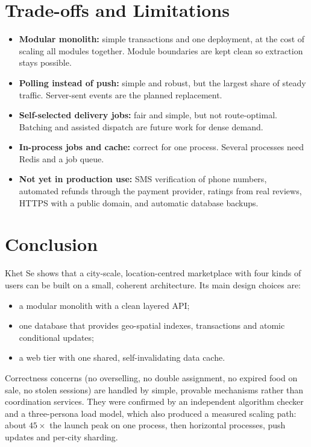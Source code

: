 \documentclass[11pt,a4paper]{article}
\begin{document}
\section{Trade-offs and Limitations}

\begin{itemize}
  \item \textbf{Modular monolith:} simple transactions and one deployment, at the cost of scaling all modules together. Module boundaries are kept clean so extraction stays possible.
  \item \textbf{Polling instead of push:} simple and robust, but the largest share of steady traffic. Server-sent events are the planned replacement.
  \item \textbf{Self-selected delivery jobs:} fair and simple, but not route-optimal. Batching and assisted dispatch are future work for dense demand.
  \item \textbf{In-process jobs and cache:} correct for one process. Several processes need Redis and a job queue.
  \item \textbf{Not yet in production use:} SMS verification of phone numbers, automated refunds through the payment provider, ratings from real reviews, HTTPS with a public domain, and automatic database backups.
\end{itemize}

\section{Conclusion}

Khet Se shows that a city-scale, location-centred marketplace with four kinds of users can be built on a small, coherent architecture. Its main design choices are:
\begin{itemize}
  \item a modular monolith with a clean layered API;
  \item one database that provides geo-spatial indexes, transactions and atomic conditional updates;
  \item a web tier with one shared, self-invalidating data cache.
\end{itemize}
Correctness concerns (no overselling, no double assignment, no expired food on sale, no stolen sessions) are handled by simple, provable mechanisms rather than coordination services. They were confirmed by an independent algorithm checker and a three-persona load model, which also produced a measured scaling path: about $45\times$ the launch peak on one process, then horizontal processes, push updates and per-city sharding.
\end{document}
